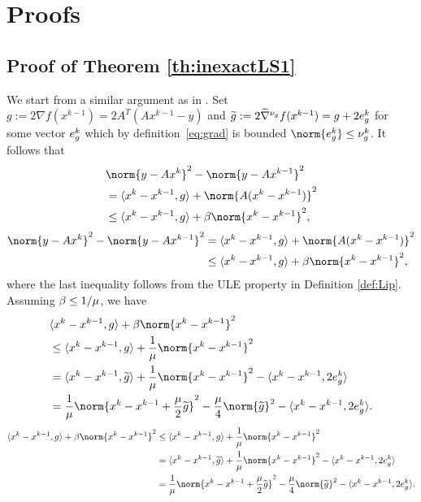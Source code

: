 \section{Proofs}
\subsection{Proof of Theorem \ref{th:inexactLS1}}
We start from a similar argument as in \cite[proof of Therorem~2]{Blumen}. 
Set $g := 2\nabla f(x^{k-1})=2A^T(Ax^{k-1}-y)$ and $\widetilde g:=2\widetilde{\nabla}^{\nu_g} f(x^{k-1})= g+2e_g^k$ for some vector $e_g^k$ which by definition~\eqref{eq:grad} is bounded $\norm{\eg^k}\leq \nug^k$. It follows that
\ifCLASSOPTIONtwocolumn
\begin{align*} 
&\norm{y-Ax^k}^2-\norm{y-Ax^{k-1}}^2	\\
&= \langle x^k-x^{k-1},g \rangle +\norm{A(x^k-x^{k-1})}^2 \\
&\leq \langle x^k-x^{k-1},g \rangle + \MM \norm{x^k-x^{k-1}}^2, 
\end{align*}
\else
\begin{align*} 
\norm{y-Ax^k}^2-\norm{y-Ax^{k-1}}^2	&= \langle x^k-x^{k-1},g \rangle +\norm{A(x^k-x^{k-1})}^2 \\
&\leq \langle x^k-x^{k-1},g \rangle + \MM \norm{x^k-x^{k-1}}^2, 
\end{align*}
\fi
where the last inequality follows from the ULE property in Definition \ref{def:Lip}. Assuming $\beta \leq 1/\mu$, we have
\ifCLASSOPTIONtwocolumn
\begin{align*}
&\langle x^k-x^{k-1},g \rangle + \MM \norm{x^k-x^{k-1}}^2 \\
& \leq \langle x^k-x^{k-1},g \rangle + \frac{1}{\mu} \norm{x^k-x^{k-1}}^2\\
&= \langle x^k-x^{k-1},\g \rangle + \frac{1}{\mu} \norm{x^k-x^{k-1}}^2 - \langle x^k-x^{k-1},2\eg^k \rangle\\
& = \frac{1}{\mu} \norm{x^k-x^{k-1}+\frac{\mu}{2} \g }^2 - \frac{\mu}{4} \norm{\g}^2 - \langle x^k-x^{k-1},2\eg^k \rangle.
\end{align*}
\else
\begin{align*}
\langle x^k-x^{k-1},g \rangle + \MM \norm{x^k-x^{k-1}}^2 
& \leq \langle x^k-x^{k-1},g \rangle + \frac{1}{\mu} \norm{x^k-x^{k-1}}^2\\
&= \langle x^k-x^{k-1},\g \rangle + \frac{1}{\mu} \norm{x^k-x^{k-1}}^2 - \langle x^k-x^{k-1},2\eg^k \rangle\\
& = \frac{1}{\mu} \norm{x^k-x^{k-1}+\frac{\mu}{2} \g }^2 - \frac{\mu}{4} \norm{\g}^2 - \langle x^k-x^{k-1},2\eg^k \rangle.
\end{align*}
